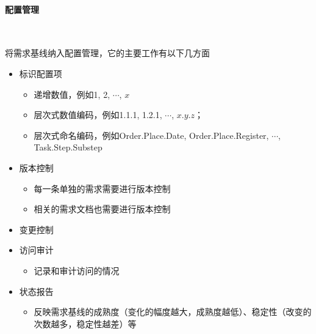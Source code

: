 \paragraph*{配置管理}~{} \par
将需求基线纳入配置管理，它的主要工作有以下几方面
\vspace{-0.8em}
\begin{multicols}{2}
    \begin{itemize}
        \item 标识配置项
        \begin{itemize}
            \item 递增数值，例如1, 2, $\cdots$, $x$
            \item 层次式数值编码，例如1.1.1, 1.2.1, $\cdots$, $x.y.z$；
            \item 层次式命名编码，例如Order.Place.Date, Order.Place.Register, $\cdots$, Task.Step.Substep
        \end{itemize}
        \item 版本控制
        \begin{itemize}
            \item 每一条单独的需求需要进行版本控制
            \item 相关的需求文档也需要进行版本控制
        \end{itemize}
        \item 变更控制
        \item 访问审计
        \begin{itemize}
            \item 记录和审计访问的情况
        \end{itemize}
        \item 状态报告
        \begin{itemize}
            \item 反映需求基线的成熟度（变化的幅度越大，成熟度越低）、稳定性（改变的次数越多，稳定性越差）等
        \end{itemize}
    \end{itemize}
\end{multicols}
\vspace{-1em}

